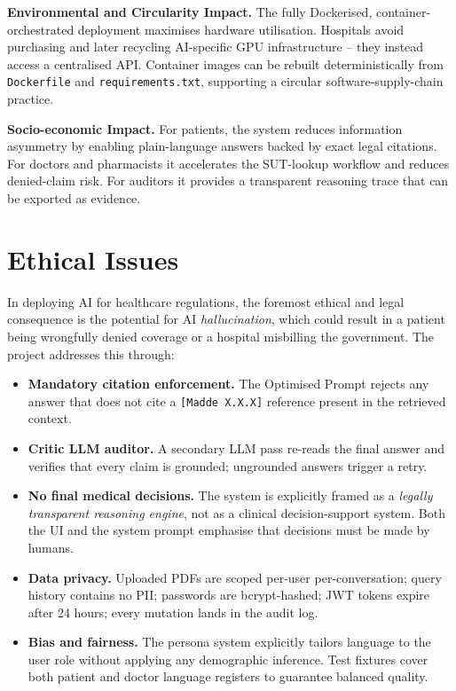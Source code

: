 \documentclass[11pt, a4paper]{article}
\begin{document}
\begin{itemize}[leftmargin=*]
\textbf{Environmental and Circularity Impact.} The fully Dockerised, container-orchestrated deployment maximises hardware utilisation. Hospitals avoid purchasing and later recycling AI-specific GPU infrastructure -- they instead access a centralised API. Container images can be rebuilt deterministically from \texttt{Dockerfile} and \texttt{requirements.txt}, supporting a circular software-supply-chain practice.

\textbf{Socio-economic Impact.} For patients, the system reduces information asymmetry by enabling plain-language answers backed by exact legal citations. For doctors and pharmacists it accelerates the SUT-lookup workflow and reduces denied-claim risk. For auditors it provides a transparent reasoning trace that can be exported as evidence.

\section{Ethical Issues}

In deploying AI for healthcare regulations, the foremost ethical and legal consequence is the potential for AI \textit{hallucination}, which could result in a patient being wrongfully denied coverage or a hospital misbilling the government. The project addresses this through:

\begin{itemize}[leftmargin=*]
    \item \textbf{Mandatory citation enforcement.} The Optimised Prompt rejects any answer that does not cite a \texttt{[Madde X.X.X]} reference present in the retrieved context.
    \item \textbf{Critic LLM auditor.} A secondary LLM pass re-reads the final answer and verifies that every claim is grounded; ungrounded answers trigger a retry.
    \item \textbf{No final medical decisions.} The system is explicitly framed as a \textit{legally transparent reasoning engine}, not as a clinical decision-support system. Both the UI and the system prompt emphasise that decisions must be made by humans.
    \item \textbf{Data privacy.} Uploaded PDFs are scoped per-user per-conversation; query history contains no PII; passwords are bcrypt-hashed; JWT tokens expire after 24 hours; every mutation lands in the audit log.
    \item \textbf{Bias and fairness.} The persona system explicitly tailors language to the user role without applying any demographic inference. Test fixtures cover both patient and doctor language registers to guarantee balanced quality.
\end{itemize}


\end{itemize}
\end{document}
